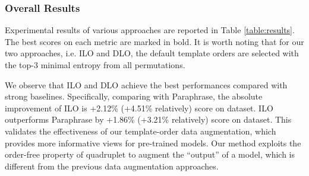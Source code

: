\documentclass[11pt]{article}
\begin{document}
\begin{table}[]
\small
    \centering
    \caption{Evaluation results of ablation study.}
    \label{table:results_ablation}
\end{table}

\subsubsection{Overall Results}
Experimental results of various approaches are reported in Table \ref{table:results}. The best scores on each metric are marked in bold. It is worth noting that for our two approaches, i.e. ILO and DLO, the default template orders are selected with the top-3 minimal entropy from all permutations. 

We observe that ILO and DLO achieve the best performances compared with strong baselines. Specifically, comparing with Paraphrase, the absolute improvement of ILO is +2.12\% (+4.51\% relatively)  score on  dataset. ILO outperforms Paraphrase by +1.86\% (+3.21\% relatively)  score on  dataset. This validates the effectiveness of our template-order data augmentation, which provides more informative views for pre-trained models. Our method exploits the order-free property of quadruplet to augment the ``output'' of a model, which is different from the previous data augmentation approaches. 
\end{document}
